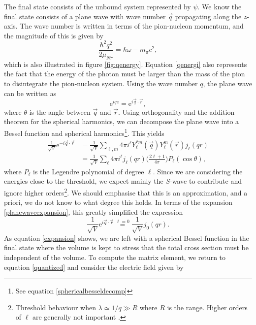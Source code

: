 The final state consists of the unbound system represented by $\psi$. We know the final state consists of a plane wave with wave number $\vec{q}$ propagating along the $z$-axis. The wave number  is written in terms of the pion-nucleon momentum, and the magnitude of this is given by
\begin{equation}\label{qenergi}
	\frac{\hbar^2 q^2}{2\mu_{N\pi}}=\hbar \omega-m_\pi c^2,
\end{equation}
which is also illustrated in figure \ref{fig:qenergy}. Equation \eqref{qenergi} also represents the fact that the energy of the photon must be larger than the mass of the pion to disintegrate the pion-nucleon system. Using the wave number $q$, the plane wave can be written as 
\begin{equation} \label{key}
	\text{e}^{iqz} = \text{e}^{i \vec{q}\cdot \vec{r}},
\end{equation}
where $\theta$ is the angle between $\vec{q}$ and $\vec{r}$. Using orthogonality and the addition theorem for the spherical harmonics, we can decompose the plane wave into a Bessel function and spherical harmonics\footnote{See equation \eqref{sphericalbesseldecomp}}. This yields
\begin{align}\label{planewaveexpansion}
	\frac{1}{\sqrt{V}} \text{e}^{-i\vec{q}\cdot\vec{r}} &= \frac{1}{\sqrt{V}} \sum_{\ell,m} 4\pi i^\ell Y_\ell^{*m}(\vec{q})Y_\ell^m(\vec{r})j_\ell(qr) \\
	&= \frac{1}{\sqrt{V}} \sum_\ell 4\pi i^\ell j_\ell(qr) \bigg( \frac{2\ell+1}{4\pi}\bigg)P_\ell(\cos\theta),
\end{align}
where $P_\ell$ is the Legendre polynomial of degree $\ell$. Since we are considering the energies close to the threshold, we expect mainly the $S$-wave to contribute and ignore higher orders\footnote{Threshold behaviour when $\lambda\simeq1/q\gg R$ where $R$ is the range. Higher orders of $\ell$ are generally not important \cite{Sakurai}.}. We should emphasise that this is an approximation, and a priori, we do not know to what degree this holds. In terms of the expansion \eqref{planewaveexpansion}, this greatly simplified the expression
\begin{equation} \label{expansion}
	\frac{1}{\sqrt{V}}\text{e}^{i\vec{q}\cdot \vec{r}} \stackrel{\ell=0}{=} \frac{1}{\sqrt{V}}j_0(qr).
\end{equation}
As equation \eqref{expansion} shows, we are left with a spherical Bessel function in the final state where the volume is kept to stress that the total cross section must be independent of the volume. To compute the matrix element, we return to equation \eqref{quantized} and consider the electric field given by

